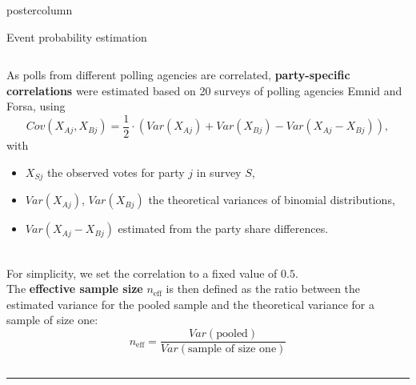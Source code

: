 \documentclass[final,hyperref={pdfpagelabels=false}]{beamer}
\let\olditem\item
\renewcommand\item{\justifying\olditem} %
\newcommand{\darkgray}[1]{\textcolor{koaladarkgray}{#1}}
\begin{document}
\begin{frame}
\begin{columns}
\begin{column}{1\textwidth}
\begin{columns}[T]
\begin{column}{.484\textwidth}
\begin{beamercolorbox}[center,wd=\textwidth]{postercolumn}
\begin{minipage}[T]{.95\textwidth}
\begin{block}{\footnotesize Event probability estimation}
\begin{minipage}{\textwidth}
\begin{columns}[t]
  \begin{column}{.93\textwidth}
  \vspace{7px}
  \begin{minipage}{\textwidth}
As polls from different polling agencies are correlated, \darkgray{\textbf{party-specific correlations}} were
estimated based on 20 surveys of polling agencies Emnid and Forsa, using
$$
Cov(X_{Aj}, X_{Bj}) = \frac{1}{2} \cdot \left(Var(X_{Aj}) + Var(X_{Bj}) - Var(X_{Aj} - X_{Bj}) \right),
$$
\darkgray{\footnotesize with \\}
\begin{minipage}{\textwidth}
\hspace{0.5in}
\begin{itemize}
  \item \darkgray{\footnotesize $X_{Sj}$ the observed votes for party $j$ in survey $S$,}
  \item \darkgray{\footnotesize $Var(X_{Aj})$, $Var(X_{Bj})$ the theoretical variances of binomial distributions,}
  \item \darkgray{\footnotesize $Var(X_{Aj} - X_{Bj})$ estimated from the party share differences.}
\end{itemize}
\end{minipage}
\\[0.8cm]
For simplicity, we set the correlation to a fixed value of $0.5$.
\\[0.5cm]
The \darkgray{\textbf{effective sample size}} $n_{\text{eff}}$ is then defined as the ratio between
the estimated variance for the pooled sample and the theoretical variance for a
sample of size one: \\[0.1cm]
$$
n_{\text{eff}} = \frac{Var(\text{pooled})}{Var(\text{sample of size one})}
$$
  \end{minipage}
  \vspace{7px}
  \end{column}
\end{columns}
\end{minipage}
\vspace{1ex}
\textcolor{LMUlightgray}{\hrule{}}


\end{block}
\end{minipage}
\end{beamercolorbox}
\end{column}
\end{columns}
\end{column}
\end{columns}
\end{frame}
\end{document}
